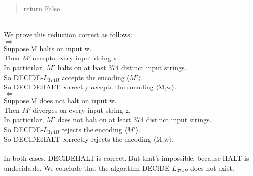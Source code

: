 \documentclass[11pt]{article}
\begin{document}
\begin{solution}
\begin{quote}
{\begin{minipage}{25em}
        \newline
        \hspace*{5ex} return False
        \end{minipage}}
\end{quote} \\
We prove this reduction correct as follows: \\
$\Longrightarrow$ \\
Suppose M halts on input w. \\
Then $M'$ accepts every input string x. \\
In particular, $M'$ halts on at least 374 distinct input strings. \\
So DECIDE-$L_{374H}$ accepts the encoding $\langle$$M'$$\rangle$. \\
So DECIDEHALT correctly accepts the encoding $\langle$M,w$\rangle$. \\
$\Longleftarrow$ \\
Suppose M does not halt on input w. \\
Then $M'$ diverges on every input string x. \\
In particular, $M'$ does not halt on at least 374 distinct input strings. \\
So DECIDE-$L_{374H}$ rejects the encoding $\langle$$M'$$\rangle$. \\
So DECIDEHALT correctly rejects the encoding $\langle$M,w$\rangle$. \\\\
In both cases, DECIDEHALT is correct. But that's impossible, because HALT is undecidable. We conclude that the algorithm DECIDE-$L_{374H}$ does not exist.
\end{solution}
\end{document}
